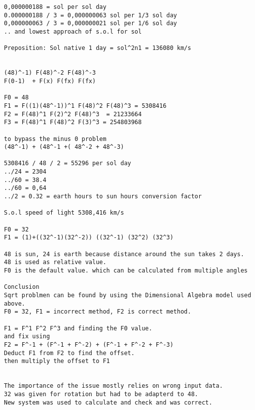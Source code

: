 \documentclass{article}
\begin{document}
\begin{verbatim}
0,000000188 = sol per sol day
0.000000188 / 3 = 0,000000063 sol per 1/3 sol day
0,000000063 / 3 = 0,000000021 sol per 1/6 sol day 
.. and lowest approach of s.o.l for sol

Preposition: Sol native 1 day = sol^2n1 = 136080 km/s   


(48)^-1) F(48)^-2 F(48)^-3 
F(0-1)  + F(x) F(fx) F(fx)

F0 = 48
F1 = F((1)(48^-1))^1 F(48)^2 F(48)^3 = 5308416
F2 = F(48)^1 F(2)^2 F(48)^3  = 21233664
F3 = F(48)^1 F(48)^2 F(3)^3 = 254803968

to bypass the minus 0 problem
(48^-1) + (48^-1 +( 48^-2 + 48^-3)

5308416 / 48 / 2 = 55296 per sol day
../24 = 2304
../60 = 38.4
../60 = 0,64
../2 = 0.32 = earth hours to sun hours conversion factor

S.o.l speed of light 5308,416 km/s

F0 = 32
F1 = (1)+((32^-1)(32^-2)) ((32^-1) (32^2) (32^3)

48 is sun, 24 is earth because distance around the sun takes 2 days.
48 is used as relative value. 
F0 is the default value. which can be calculated from multiple angles

Conclusion
Sqrt problmen can be found by using the Dimensional Algebra model used above.
F0 = 32, F1 = incorrect method, F2 is correct method. 

F1 = F^1 F^2 F^3 and finding the F0 value.
and fix using
F2 = F^-1 + (F^-1 + F^-2) + (F^-1 + F^-2 + F^-3)
Deduct F1 from F2 to find the offset. 
then multiply the offset to F1


The importance of the issue mostly relies on wrong input data.
32 was given for rotation but had to be adapterd to 48.
New system was used to calculate and check and was correct.

\end{verbatim}
\end{document}

